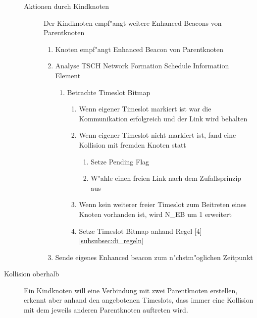 \begin{description}
\begin{description}
    \item [Aktionen durch Kindknoten] Der Kindknoten empf"angt weitere
    Enhanced Beacons von Parentknoten
    \begin{enumerate}
      \item Knoten empf"angt Enhanced Beacon von Parentknoten
      \item Analyse TSCH Network Formation Schedule Information Element
      \begin{enumerate}
        \item Betrachte Timeslot Bitmap
        \begin{enumerate}
          \item Wenn eigener Timeslot markiert ist war die Kommunikation erfolgreich
          und der Link wird behalten
          \item Wenn eigener Timeslot nicht markiert ist, fand eine Kollision mit
          fremden Knoten statt
          \begin{enumerate}
            \item Setze Pending Flag
            \item W"ahle einen freien Link nach dem Zufallsprinzip aus
          \end{enumerate}
          \item Wenn kein weiterer freier Timeslot zum Beitreten eines Knoten
          vorhanden ist, wird N\_EB um 1 erweitert
          \item Setze Timeslot Bitmap anhand Regel [4] \ref{subsubsec:di_regeln}
        \end{enumerate}
      \end{enumerate}
    \item Sende eigenes Enhanced beacon zum n"chstm"oglichen Zeitpunkt
  \end{enumerate}
  \end{description}
  \item [Kollision oberhalb] Ein Kindknoten will eine Verbindung mit zwei Parentknoten
  erstellen, erkennt aber anhand den angebotenen Timeslots, dass immer eine Kollision
  mit dem jeweils anderen Parentknoten auftreten wird.


\end{description}
